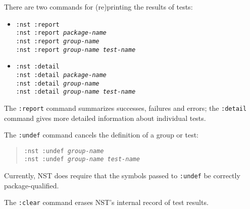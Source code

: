 There are two commands for (re)printing the results of tests:
\begin{itemize}
\item\texttt{:nst :report}
\\ \texttt{:nst :report {\itshape package-name}}
\\ \texttt{:nst :report {\itshape group-name}}
\\ \texttt{:nst :report {\itshape group-name} {\itshape test-name}}
\item\texttt{:nst :detail}
\\ \texttt{:nst :detail {\itshape package-name}}
\\ \texttt{:nst :detail {\itshape group-name}}
\\ \texttt{:nst :detail {\itshape group-name} {\itshape test-name}}
\end{itemize}
The \texttt{:report} command summarizes successes, failures and
errors; the \texttt{:detail} command gives more detailed information
about individual tests.

The \texttt{:undef} command cancels the definition of a group or test:
\begin{quotation}\noindent
 \texttt{:nst :undef {\itshape group-name}}
\\ \texttt{:nst :undef {\itshape group-name} {\itshape test-name}}
\end{quotation}
Currently, NST does require that the symbols passed to \texttt{:undef}
be correctly package-qualified.

The \texttt{:clear} command erases NST's internal record of test
results.

